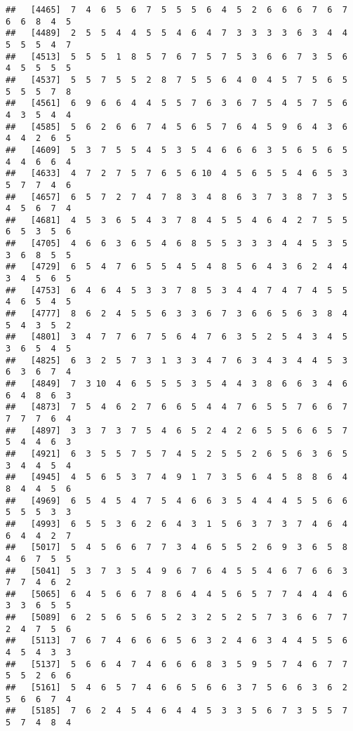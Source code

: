 \documentclass[
]{book}
\begin{document}
\begin{verbatim}
##   [4465]  7  4  6  5  6  7  5  5  5  6  4  5  2  6  6  6  7  6  7  6  6  8  4  5
##   [4489]  2  5  5  4  4  5  5  4  6  4  7  3  3  3  3  6  3  4  4  5  5  5  4  7
##   [4513]  5  5  5  1  8  5  7  6  7  5  7  5  3  6  6  7  3  5  6  4  5  5  5  5
##   [4537]  5  5  7  5  5  2  8  7  5  5  6  4  0  4  5  7  5  6  5  5  5  5  7  8
##   [4561]  6  9  6  6  4  4  5  5  7  6  3  6  7  5  4  5  7  5  6  4  3  5  4  4
##   [4585]  5  6  2  6  6  7  4  5  6  5  7  6  4  5  9  6  4  3  6  4  4  2  6  5
##   [4609]  5  3  7  5  5  4  5  3  5  4  6  6  6  3  5  6  5  6  5  4  4  6  6  4
##   [4633]  4  7  2  7  5  7  6  5  6 10  4  5  6  5  5  4  6  5  3  5  7  7  4  6
##   [4657]  6  5  7  2  7  4  7  8  3  4  8  6  3  7  3  8  7  3  5  4  5  6  7  4
##   [4681]  4  5  3  6  5  4  3  7  8  4  5  5  4  6  4  2  7  5  5  6  5  3  5  6
##   [4705]  4  6  6  3  6  5  4  6  8  5  5  3  3  3  4  4  5  3  5  3  6  8  5  5
##   [4729]  6  5  4  7  6  5  5  4  5  4  8  5  6  4  3  6  2  4  4  3  4  5  6  5
##   [4753]  6  4  6  4  5  3  3  7  8  5  3  4  4  7  4  7  4  5  5  4  6  5  4  5
##   [4777]  8  6  2  4  5  5  6  3  3  6  7  3  6  6  5  6  3  8  4  5  4  3  5  2
##   [4801]  3  4  7  7  6  7  5  6  4  7  6  3  5  2  5  4  3  4  5  3  6  5  4  5
##   [4825]  6  3  2  5  7  3  1  3  3  4  7  6  3  4  3  4  4  5  3  6  3  6  7  4
##   [4849]  7  3 10  4  6  5  5  5  3  5  4  4  3  8  6  6  3  4  6  6  4  8  6  3
##   [4873]  7  5  4  6  2  7  6  6  5  4  4  7  6  5  5  7  6  6  7  7  7  7  6  4
##   [4897]  3  3  7  3  7  5  4  6  5  2  4  2  6  5  5  6  6  5  7  5  4  4  6  3
##   [4921]  6  3  5  5  7  5  7  4  5  2  5  5  2  6  5  6  3  6  5  3  4  4  5  4
##   [4945]  4  5  6  5  3  7  4  9  1  7  3  5  6  4  5  8  8  6  4  8  4  4  5  6
##   [4969]  6  5  4  5  4  7  5  4  6  6  3  5  4  4  4  5  5  6  6  5  5  5  3  3
##   [4993]  6  5  5  3  6  2  6  4  3  1  5  6  3  7  3  7  4  6  4  6  4  4  2  7
##   [5017]  5  4  5  6  6  7  7  3  4  6  5  5  2  6  9  3  6  5  8  4  6  7  5  5
##   [5041]  5  3  7  3  5  4  9  6  7  6  4  5  5  4  6  7  6  6  3  7  7  4  6  2
##   [5065]  6  4  5  6  6  7  8  6  4  4  5  6  5  7  7  4  4  4  6  3  3  6  5  5
##   [5089]  6  2  5  6  5  6  5  2  3  2  5  2  5  7  3  6  6  7  7  2  4  7  5  6
##   [5113]  7  6  7  4  6  6  6  5  6  3  2  4  6  3  4  4  5  5  6  4  5  4  3  3
##   [5137]  5  6  6  4  7  4  6  6  6  8  3  5  9  5  7  4  6  7  7  5  5  2  6  6
##   [5161]  5  4  6  5  7  4  6  6  5  6  6  3  7  5  6  6  3  6  2  5  6  6  7  4
##   [5185]  7  6  2  4  5  4  6  4  4  5  3  3  5  6  7  3  5  5  7  5  7  4  8  4

\end{verbatim}
\end{document}
